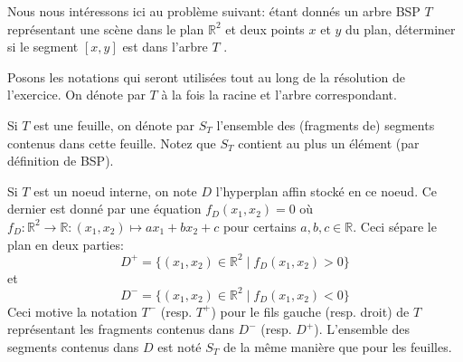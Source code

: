 
Nous nous intéressons ici au problème suivant: \og étant donnés
un arbre BSP $T$ représentant une scène dans le plan $\mathbb{R}^2$
et deux points $x$ et $y$ du plan, déterminer si le segment $[x, y]$
est dans l'arbre $T$ \fg.

Posons les notations qui seront utilisées tout au long de la
résolution de l'exercice. On dénote par $T$ à la fois la
racine et l'arbre correspondant.

Si $T$ est une feuille, on dénote par $S_T$ l'ensemble des
(fragments de) segments contenus dans cette feuille.
Notez que $S_T$ contient au plus un élément (par définition de BSP).

Si $T$ est un noeud interne, on note $D$ l'hyperplan affin stocké
en ce noeud. Ce dernier est donné par une équation $f_D(x_1, x_2) = 0$
où $f_D: \mathbb{R}^2 \to \mathbb{R}: (x_1, x_2)\mapsto a x_1 + b x_2 +c$
pour certains $a, b, c\in\mathbb{R}$. Ceci sépare le plan en deux
parties: $$D^+=\{(x_1, x_2)\in\mathbb{R}^2\mid f_D(x_1, x_2) > 0\}$$ et
$$D^-=\{(x_1, x_2)\in\mathbb{R}^2\mid f_D(x_1, x_2) < 0\}$$
Ceci motive la notation $T^-$ (resp. $T^+$) pour le fils gauche
(resp. droit) de $T$ représentant les fragments contenus dans $D^-$
(resp. $D^+$). L'ensemble des segments contenus dans $D$ est noté
$S_T$ de la même manière que pour les feuilles.
